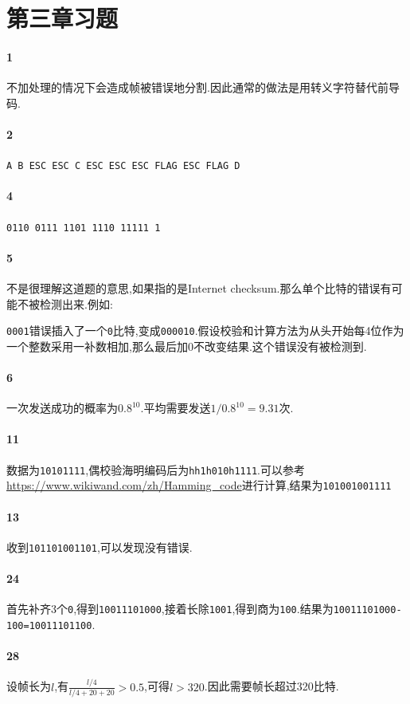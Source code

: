 \documentclass[a4paper]{article}
\begin{document}
\courseheader
{}
\section{第三章习题}
\paragraph{1}
不加处理的情况下会造成帧被错误地分割.因此通常的做法是用转义字符替代前导码.
\paragraph{2}
\verb|A B ESC ESC C ESC ESC ESC FLAG ESC FLAG D|
\paragraph{4}
\verb|0110 0111 1101 1110 11111 1|
\paragraph{5}
不是很理解这道题的意思,如果指的是Internet checksum.那么单个比特的错误有可能不被检测出来.例如:

\verb|0001|错误插入了一个\verb|0|比特,变成\verb|000010|.假设校验和计算方法为从头开始每4位作为一个整数采用一补数相加,那么最后加0不改变结果.这个错误没有被检测到.
\paragraph{6}
一次发送成功的概率为$0.8^{10}$.平均需要发送$1/0.8^{10}=9.31$次.
\paragraph{11}
数据为\verb|10101111|,偶校验海明编码后为\verb|hh1h010h1111|.可以参考\url{https://www.wikiwand.com/zh/Hamming_code}进行计算,结果为\verb|101001001111|
\paragraph{13}
收到\verb|101101001101|,可以发现没有错误.
\paragraph{24}
首先补齐3个\verb|0|,得到\verb|10011101000|,接着长除\verb|1001|,得到商为\verb|100|.结果为\verb|10011101000-100=10011101100|.
\paragraph{28}
设帧长为$l$,有$\frac{l/4}{l/4+20+20}>0.5$,可得$l>320$.因此需要帧长超过320比特.
\end{document}
